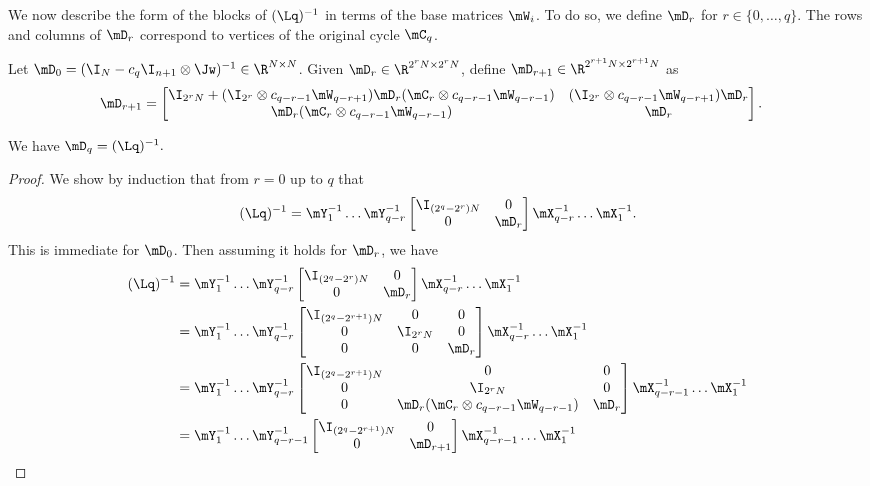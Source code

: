 We now describe the form of the blocks of $(\Lq)^{-1}$ in terms of the base matrices $\mW_i$. To do so, we define $\mD_r$ for $r\in \{0,\ldots,q\}$. The rows and columns of $\mD_r$ correspond to vertices of the original cycle $\mC_{q}$. 
\begin{definition}\label{def:D}
Let $\mD_{0}=(\I_N-c_q\I_{n+1}\otimes \Jw)^{-1}\in \R^{N \times N}$. Given $\mD_{r} \in \R^{2^{r}N\times 2^{r}N}$, define $\mD_{r+1}\in\R^{2^{r+1}N\times 2^{r+1}N}$ as
\begin{align*}
    \mD_{r+1} &= \begin{bmatrix}\I_{2^{r}N}+(\I_{2^{r}}\otimes c_{q-r-1}\mW_{q-r+1})\mD_{r}(\mC_{r} \otimes c_{q-r-1}\mW_{q-r-1}) & (\I_{2^r}\otimes c_{q-r-1}\mW_{q-r+1})\mD_{r}\\ \mD_{r}(\mC_{r} \otimes c_{q-r-1}\mW_{q-r-1}) & \mD_{r}\end{bmatrix}.
\end{align*}

\end{definition}
%
\begin{lemma}\label{lem:Dzeroform}
We have $\mD_q=(\Lq)^{-1}.$
\end{lemma}
\begin{proof}
We show by induction that from $r=0$ up to $q$ that
\[(\Lq)^{-1}=\mY_1^{-1}\dots \mY_{q-r}^{-1}\begin{bmatrix}
 \I_{(2^q-2^{r})N} & 0\\ 0 & \mD_r\end{bmatrix}\mX_{q-r}^{-1}\dots\mX_1^{-1}.
\]
This is immediate for $\mD_0$. Then assuming it holds for $\mD_r$, 
we have %
\begin{align*}
    (\Lq)^{-1} &=\mY_1^{-1}\dots \mY_{q-r}^{-1}
    \begin{bmatrix}\I_{(2^q-2^{r})N} & 0\\ 0 & \mD_r\end{bmatrix}
    \mX_{q-r}^{-1}\dots\mX_1^{-1}\\
    &= \mY_1^{-1}\dots \mY_{q-r}^{-1}\begin{bmatrix}
 \I_{(2^q-2^{r+1})N} & 0 & 0\\ 0 & \I_{2^{r}N} & 0\\ 0 & 0 & \mD_r\end{bmatrix}\mX_{q-r}^{-1}\dots\mX_1^{-1}\\
 &= \mY_1^{-1}\dots \mY_{q-r}^{-1}\begin{bmatrix}
 \I_{(2^q-2^{r+1})N} & 0 & 0\\ 0 & \I_{2^{r}N} & 0\\ 0 & \mD_{r}(\mC_{r}\otimes c_{q-r-1}\mW_{q-r-1}) & \mD_r\end{bmatrix}\mX_{q-r-1}^{-1}\dots\mX_1^{-1}\\
 &= \mY_1^{-1}\dots \mY_{q-r-1}^{-1}\begin{bmatrix}
 \I_{(2^q-2^{r+1})N} & 0 \\ 0 & \mD_{r+1} \end{bmatrix}\mX_{q-r-1}^{-1}\dots\mX_1^{-1}\qedhere
\end{align*}
\end{proof}

